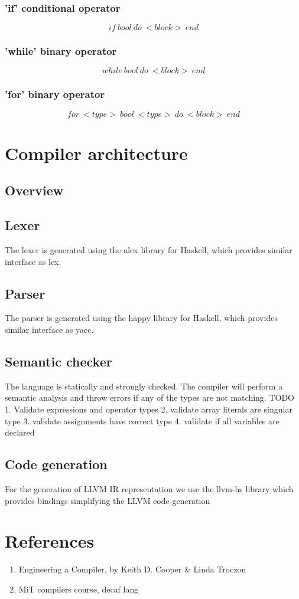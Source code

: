 \documentclass{article}
\begin{document}
\subsubsection{'if' conditional operator}
$$
if \ bool \ do \ <block> \ end
$$
\subsubsection{'while' binary operator}
$$
while \ bool \ do \ <block> \ end
$$
\subsubsection{'for' binary operator}
$$
for \ <type> \ bool \ <type> \ do \ <block> \ end
$$

\section{Compiler architecture}
\subsection{Overview}

\subsection{Lexer}
The lexer is generated using the alex library for Haskell, which provides similar interface as lex. 

\subsection{Parser}
The parser is generated using the happy library for Haskell, which provides similar interface as yacc. 


\subsection{Semantic checker}
The language is statically and strongly checked. The compiler will perform a semantic analysis and throw errors if any of the types are not matching. 
TODO
1. Validate expressions and operator types
2. validate array literals are singular type
3. validate assignments have correct type
4. validate if all variables are declared



\subsection{Code generation}
For the generation of LLVM IR representation we use the llvm-hs library which provides bindings simplifying the LLVM code generation





\section{References}
\begin{enumerate}
    \item  Engineering a Compiler, by Keith D. Cooper & Linda Troczon
    \item MiT compilers course, decaf lang
\end{enumerate}
\end{document}
